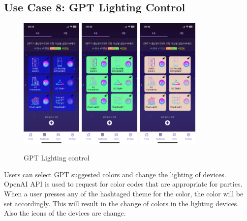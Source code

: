 \documentclass[conference]{IEEEtran}
\begin{document}
    \subsection{Use Case 8: GPT Lighting Control}
        \begin{figure}[htbp]
            \centerline{\includegraphics[width=3cm]{Images/screen/light/10_LIGHT_BLUE_HIGH.PNG}
            \includegraphics[width=3cm]{Images/screen/light/12_LIGHT_GREEN.PNG}
             \includegraphics[width=3cm]{Images/screen/light/13_LIGHT_WARM.PNG}}
            \caption{GPT Lighting control}
            \label{fig}
        \end{figure}
        Users can select GPT suggested colors and change the lighting of devices. OpenAI API is used to request for color codes that are appropriate for parties. When a user presses any of the hashtaged theme for the color, the color will be set accordingly. This will result in the change of colors in the lighting devices. Also the icons of the devices are change.
\end{document}
